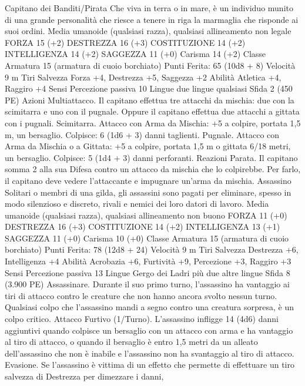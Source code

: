 \begin{multicols}{2}
Capitano dei Banditi/Pirata
Che viva in terra o in mare, è un individuo munito di una
grande personalità che riesce a tenere in riga la
marmaglia che risponde ai suoi ordini.
Media umanoide (qualsiasi razza), qualsiasi allineamento non
legale
FORZA 15 (+2)
DESTREZZA 16 (+3)
COSTITUZIONE 14 (+2)
INTELLIGENZA 14 (+2)
SAGGEZZA 11 (+0)
Carisma 14 (+2)
Classe Armatura 15 (armatura di cuoio borchiato)
\hspace*{0pt}\hfill{Punti Ferita}: 65 (10d8 + 8)
Velocità 9 m
Tiri Salvezza Forza +4, Destrezza +5, Saggezza +2
Abilità Atletica +4, Raggiro +4
Sensi Percezione passiva 10
Lingue due lingue qualsiasi
Sfida 2 (450 PE)
Azioni
Multiattacco. Il capitano effettua tre attacchi da mischia: due con
la scimitarra e uno con il pugnale. Oppure il capitano effettua
due attacchi a gittata con i pugnali.
Scimitarra. Attacco con Arma da Mischia: +5 a colpire, portata
1,5 m, un bersaglio.
Colpisce: 6 (1d6 + 3) danni taglienti.
Pugnale. Attacco con Arma da Mischia o a Gittata: +5 a colpire,
portata 1,5 m o gittata 6/18 metri, un bersaglio.
Colpisce: 5 (1d4 + 3) danni perforanti.
Reazioni
Parata. Il capitano somma 2 alla sua Difesa contro un attacco da
mischia che lo colpirebbe. Per farlo, il capitano deve vedere
l’attaccante e impugnare un’arma da mischia.
Assassino
Solitari o membri di una gilda, gli assassini sono pagati
per eliminare, spesso in modo silenzioso e discreto,
rivali e nemici dei loro datori di lavoro.
Media umanoide (qualsiasi razza), qualsiasi allineamento non
buono
FORZA 11 (+0)
DESTREZZA 16 (+3)
COSTITUZIONE 14 (+2)
INTELLIGENZA 13 (+1)
SAGGEZZA 11 (+0)
Carisma 10 (+0)
Classe Armatura 15 (armatura di cuoio borchiato)
\hspace*{0pt}\hfill{Punti Ferita}: 78 (12d8 + 24)
Velocità 9 m
Tiri Salvezza Destrezza +6, Intelligenza +4
Abilità Acrobazia +6, Furtività +9, Percezione +3, Raggiro +3
Sensi Percezione passiva 13
Lingue Gergo dei Ladri più due altre lingue
Sfida 8 (3.900 PE)
Assassinare. Durante il suo primo turno, l’assassino ha
vantaggio ai tiri di attacco contro le creature che non hanno
ancora svolto nessun turno. Qualsiasi colpo che l’assassino
mandi a segno contro una creatura sorpresa, è un colpo critico.
Attacco Furtivo (1/Turno). L’assassino infligge 14 (4d6) danni
aggiuntivi quando colpisce un bersaglio con un attacco con arma
e ha vantaggio al tiro di attacco, o quando il bersaglio è entro 1,5
metri da un alleato dell’assassino che non è inabile e l’assassino
non ha svantaggio al tiro di attacco.
Evasione. Se l’assassino è vittima di un effetto che permette di
effettuare un tiro salvezza di Destrezza per dimezzare i danni,

\end{multicols}

